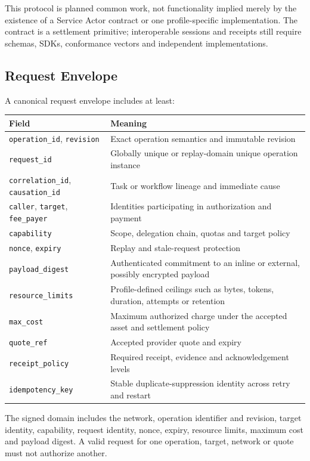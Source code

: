 \documentclass[11pt,oneside]{article}
\begin{document}
This protocol is planned common work, not functionality implied merely by the existence of a
Service Actor contract or one profile-specific implementation. The contract is a settlement
primitive; interoperable sessions and receipts still require schemas, SDKs, conformance
vectors and independent implementations.

\subsection{Request Envelope}

A canonical request envelope includes at least:

\begin{longtable}{L{0.27\textwidth}L{0.62\textwidth}}
\toprule
Field & Meaning \\
\midrule
\endhead
\texttt{operation\_id}, \texttt{revision} &
Exact operation semantics and immutable revision \\
\texttt{request\_id} &
Globally unique or replay-domain unique operation instance \\
\texttt{correlation\_id}, \texttt{causation\_id} &
Task or workflow lineage and immediate cause \\
\texttt{caller}, \texttt{target}, \texttt{fee\_payer} &
Identities participating in authorization and payment \\
\texttt{capability} &
Scope, delegation chain, quotas and target policy \\
\texttt{nonce}, \texttt{expiry} &
Replay and stale-request protection \\
\texttt{payload\_digest} &
Authenticated commitment to an inline or external, possibly encrypted payload \\
\texttt{resource\_limits} &
Profile-defined ceilings such as bytes, tokens, duration, attempts or retention \\
\texttt{max\_cost} &
Maximum authorized charge under the accepted asset and settlement policy \\
\texttt{quote\_ref} &
Accepted provider quote and expiry \\
\texttt{receipt\_policy} &
Required receipt, evidence and acknowledgement levels \\
\texttt{idempotency\_key} &
Stable duplicate-suppression identity across retry and restart \\
\bottomrule
\end{longtable}

The signed domain includes the network, operation identifier and revision, target identity,
capability, request identity, nonce, expiry, resource limits, maximum cost and payload digest.
A valid request for one operation, target, network or quote must not authorize another.
\end{document}
